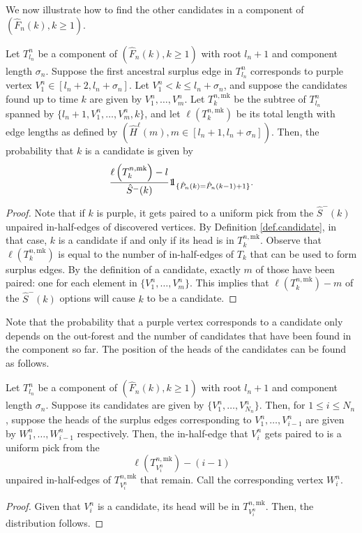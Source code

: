 We now illustrate how to find the other candidates in a component of $(\hat{F}_n(k),k\geq 1)$. 
\begin{lemma}\label{lemma.samplecandidates}
Let $T^n_{l_n}$ be a component of $(\hat{F}_n(k),k\geq 1)$ with root $l_n+1$ and component length $\sigma_n$. Suppose the first ancestral surplus edge in $T^n_{l_n}$ corresponds to purple vertex $V^n_1\in [l_n+2,l_n+\sigma_n]$. Let $V^n_1<k\leq l_n+\sigma_n$, and suppose the candidates found up to time $k$ are given by $V^n_1,\dots,V^n_m$. Let $T^{n,\text{mk}}_k$ be the subtree of $T^n_{l_n}$ spanned by $\{l_n+1,V^n_1,\dots,V^n_m,k\}$, and let $\ell(T^{n,\text{mk}}_k)$ be its total length with edge lengths as defined by $(\hat{H}^\ell(m),m\in [l_n+1,l_n+\sigma_n])$. Then, the probability that $k$ is a candidate is given by 
$$\frac{\ell\left(T^{n,\text{mk}}_k\right)-l}{\hat{S}^-(k)}\one_{\{\hat{P}_n(k)=\hat{P}_n(k-1)+1\}}.$$
\end{lemma}
\begin{proof}
Note that if $k$ is purple, it gets paired to a uniform pick from the $\hat{S}^-(k)$ unpaired in-half-edges of discovered vertices. By Definition \ref{def.candidate}, in that case, $k$ is a candidate if and only if its head is in $T^{n,\text{mk}}_k$. Observe that $\ell\left(T^{n,\text{mk}}_k\right)$ is equal to the number of in-half-edges of $T_{k}$ that can be used to form surplus edges. By the definition of a candidate, exactly $m$ of those have been paired: one for each element in $\{V^n_1,\dots,V^n_m\}$. This implies that $\ell\left(T^{n,\text{mk}}_k\right)-m$ of the $\hat{S}^-(k)$ options will cause $k$ to be a candidate.
\end{proof}

Note that the probability that a purple vertex corresponds to a candidate only depends on the out-forest and the number of candidates that have been found in the component so far. The position of the heads of the candidates can be found as follows.
\begin{lemma}\label{lemma.sampleheadcandidates}
Let $T^n_{l_n}$ be a component of $(\hat{F}_n(k),k\geq 1)$ with root $l_n+1$ and component length $\sigma_n$. Suppose its candidates are given by $\{V^n_1,\dots,V^n_{N_n}\}$. Then, for $1\leq i\leq {N_n}$, suppose the heads of the surplus edges corresponding to $V^n_1,\dots,V^n_{i-1}$ are given by $W_1^n,\dots,W^n_{i-1}$ respectively. Then, the in-half-edge that $V^n_{i}$ gets paired to is a uniform pick from the $$\ell\left(T^{n,\text{mk}}_{V^n_i}\right)-(i-1)$$ unpaired in-half-edges of $T^{n,\text{mk}}_{V^n_i}$ that remain. Call the corresponding vertex $W^n_i$.
\end{lemma}
\begin{proof}
Given that $V^n_{i}$ is a candidate, its head will be in $T^{n,\text{mk}}_{V^n_i}$. Then, the distribution follows.
\end{proof}

